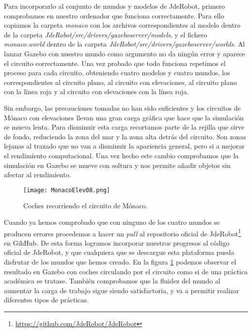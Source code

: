 Para incorporarlo al conjunto de mundos y modelos de JdeRobot, primero comprobamos en nuestro ordenador que funciona correctamente. Para ello copiamos la carpeta \textit{monaco} con los archivos correspondientes al modelo dentro de la carpeta \textit{JdeRobot/src/drivers/gazeboserver/models}, y el fichero \textit{monaco.world} dentro de la carpeta \textit{JdeRobot/src/drivers/gazeboserver/worlds}. Al lanzar Gazebo con nuestro mundo como argumento no da ningún error y aparece el circuito correctamente. Una vez probado que todo funciona repetimos el proceso para cada circuito, obteniendo cuatro modelos y cuatro mundos, los correspondientes al circuito plano, al circuito con elevaciones, al circuito plano con la línea roja y al circuito con elevaciones con la línea roja. 

Sin embargo, las precauciones tomadas no han sido suficientes y los circuitos de Mónaco con elevaciones llevan una gran carga gráfica que hace que la simulación se mueva lenta. Para disminuir esta carga recortamos parte de la rejilla que sirve de fondo, reduciendo la zona del mar y la zona alta detrás del circuito. Son zonas lejanas al trazado que no van a disminuir la apariencia general, pero si a mejorar el rendimiento computacional. Una vez hecho este cambio comprobamos que la simulación en Gazebo se mueve con soltura y nos permite añadir objetos sin afectar al rendimiento. 

\begin{figure}[h]
	\centering
	\texttt{[image: MonacoElev08.png]}
	\caption{Coches recorriendo el circuito de Mónaco.} \label{fig:monacocoches}
\end{figure}

Cuando ya hemos comprobado que con ninguno de los cuatro mundos se producen errores procedemos a hacer un \textit{pull} al repositorio oficial de JdeRobot\footnote{\url{https://github.com/JdeRobot/JdeRobot}} en GihHub. De esta forma logramos incorporar nuestros progresos al código oficial de JdeRobot, y que cualquiera que se descargue esta plataforma pueda disfrutar de los mundos que hemos creado. En la figura \ref{fig:monacocoches} podemos observar el resultado en Gazebo con coches circulando por el circuito como si de una práctica académica se tratase. También comprobamos que la fluidez del mundo al aumentar la carga de trabajo sigue siendo satisfactoria, y va a permitir realizar diferentes tipos de prácticas.

